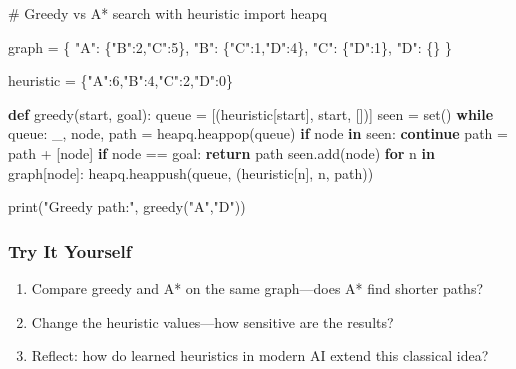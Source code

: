\documentclass[
  letterpaper,
  DIV=11,
  numbers=noendperiod]{scrreprt}
\newenvironment{Shaded}{\begin{snugshade}}{\end{snugshade}}
\newcommand{\BuiltInTok}[1]{\textcolor[rgb]{0.00,0.23,0.31}{#1}}
\newcommand{\CommentTok}[1]{\textcolor[rgb]{0.37,0.37,0.37}{#1}}
\newcommand{\ControlFlowTok}[1]{\textcolor[rgb]{0.00,0.23,0.31}{\textbf{#1}}}
\newcommand{\DecValTok}[1]{\textcolor[rgb]{0.68,0.00,0.00}{#1}}
\newcommand{\ImportTok}[1]{\textcolor[rgb]{0.00,0.46,0.62}{#1}}
\newcommand{\KeywordTok}[1]{\textcolor[rgb]{0.00,0.23,0.31}{\textbf{#1}}}
\newcommand{\NormalTok}[1]{\textcolor[rgb]{0.00,0.23,0.31}{#1}}
\newcommand{\OperatorTok}[1]{\textcolor[rgb]{0.37,0.37,0.37}{#1}}
\newcommand{\StringTok}[1]{\textcolor[rgb]{0.13,0.47,0.30}{#1}}
\providecommand{\tightlist}{%
  \setlength{\itemsep}{0pt}\setlength{\parskip}{0pt}}
\begin{document}
\begin{Shaded}
\begin{Highlighting}[]
\CommentTok{\# Greedy vs A* search with heuristic}
\ImportTok{import}\NormalTok{ heapq}

\NormalTok{graph }\OperatorTok{=}\NormalTok{ \{}
    \StringTok{"A"}\NormalTok{: \{}\StringTok{"B"}\NormalTok{:}\DecValTok{2}\NormalTok{,}\StringTok{"C"}\NormalTok{:}\DecValTok{5}\NormalTok{\},}
    \StringTok{"B"}\NormalTok{: \{}\StringTok{"C"}\NormalTok{:}\DecValTok{1}\NormalTok{,}\StringTok{"D"}\NormalTok{:}\DecValTok{4}\NormalTok{\},}
    \StringTok{"C"}\NormalTok{: \{}\StringTok{"D"}\NormalTok{:}\DecValTok{1}\NormalTok{\},}
    \StringTok{"D"}\NormalTok{: \{\}}
\NormalTok{\}}

\NormalTok{heuristic }\OperatorTok{=}\NormalTok{ \{}\StringTok{"A"}\NormalTok{:}\DecValTok{6}\NormalTok{,}\StringTok{"B"}\NormalTok{:}\DecValTok{4}\NormalTok{,}\StringTok{"C"}\NormalTok{:}\DecValTok{2}\NormalTok{,}\StringTok{"D"}\NormalTok{:}\DecValTok{0}\NormalTok{\}}

\KeywordTok{def}\NormalTok{ greedy(start, goal):}
\NormalTok{    queue }\OperatorTok{=}\NormalTok{ [(heuristic[start], start, [])]}
\NormalTok{    seen }\OperatorTok{=} \BuiltInTok{set}\NormalTok{()}
    \ControlFlowTok{while}\NormalTok{ queue:}
\NormalTok{        \_, node, path }\OperatorTok{=}\NormalTok{ heapq.heappop(queue)}
        \ControlFlowTok{if}\NormalTok{ node }\KeywordTok{in}\NormalTok{ seen: }
            \ControlFlowTok{continue}
\NormalTok{        path }\OperatorTok{=}\NormalTok{ path }\OperatorTok{+}\NormalTok{ [node]}
        \ControlFlowTok{if}\NormalTok{ node }\OperatorTok{==}\NormalTok{ goal:}
            \ControlFlowTok{return}\NormalTok{ path}
\NormalTok{        seen.add(node)}
        \ControlFlowTok{for}\NormalTok{ n }\KeywordTok{in}\NormalTok{ graph[node]:}
\NormalTok{            heapq.heappush(queue, (heuristic[n], n, path))}

\BuiltInTok{print}\NormalTok{(}\StringTok{"Greedy path:"}\NormalTok{, greedy(}\StringTok{"A"}\NormalTok{,}\StringTok{"D"}\NormalTok{))}
\end{Highlighting}
\end{Shaded}

\subsubsection{Try It Yourself}\label{try-it-yourself-64}

\begin{enumerate}
\def\labelenumi{\arabic{enumi}.}
\tightlist
\item
  Compare greedy and A* on the same graph---does A* find shorter paths?
\item
  Change the heuristic values---how sensitive are the results?
\item
  Reflect: how do learned heuristics in modern AI extend this classical
  idea?
\end{enumerate}
\end{document}

